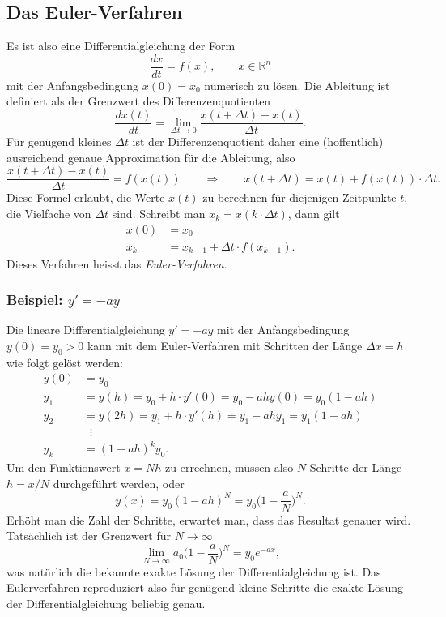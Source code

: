 %
%
%
\subsection{Das Euler-Verfahren\label{subsection:euler}}
Es ist also eine Differentialgleichung der Form
\[
\frac{dx}{dt} = f(x),\qquad x\in\mathbb R^n
\]
mit der Anfangsbedingung $x(0)=x_0$ numerisch zu lösen.
Die Ableitung ist definiert als der Grenzwert des Differenzenquotienten
\[
\frac{dx(t)}{dt}
=
\lim_{\Delta t\to 0}
\frac{x(t+\Delta t)-x(t)}{\Delta t}.
\]
Für genügend kleines $\Delta t$ ist der Differenzenquotient daher eine
(hoffentlich) ausreichend genaue Approximation für die Ableitung,
also
\begin{equation}
\frac{x(t+\Delta t)-x(t)}{\Delta t} = f(x(t))
\qquad\Rightarrow\qquad
x(t+\Delta t) = x(t) + f(x(t))\cdot \Delta t.
\label{skript:euler:differenzenquotient}
\end{equation}
Diese Formel erlaubt, die Werte $x(t)$ zu berechnen für diejenigen
Zeitpunkte $t$, die Vielfache von $\Delta t$ sind.
Schreibt man $x_k = x(k\cdot \Delta t)$, dann gilt
\begin{align*}
x(0) &= x_0\\
x_k &= x_{k-1} + \Delta t \cdot f(x_{k-1}).
\end{align*}
Dieses Verfahren heisst das {\em Euler-Verfahren}.
%

\subsubsection{Beispiel: $y'=-ay$}
Die lineare Differentialgleichung $y'=-ay$ mit der Anfangsbedingung 
$y(0)=y_0 > 0$ kann mit dem Euler-Verfahren mit Schritten der Länge $\Delta x=h$
wie folgt gelöst werden:
\begin{align*}
y(0)&=y_0\\
y_1&=y(h) = y_0 + h\cdot y'(0) = y_0  -ah y(0) = y_0(1 - ah)
\\
y_2&=y(2h) = y_1 + h\cdot y'(h) = y_1  -ah y_1 = y_1(1-ah)
\\
&\;\;\vdots
\\
y_k&= (1-ah)^k y_0.
\end{align*}
Um den Funktionswert $x=Nh$ zu errechnen, müssen also $N$ Schritte der
Länge $h=x/N$ durchgeführt werden, oder
\[
y(x) = y_0(1-ah)^N =
y_0
\biggl(
1-\frac{a}{N}
\biggr)^N.
\]
Erhöht man die Zahl der Schritte, erwartet man, dass das Resultat genauer
wird.
Tatsächlich ist der Grenzwert für $N\to\infty$
\[
\lim_{N\to\infty} a_0\biggl(1-\frac{a}{N}\biggr)^N
=
y_0
e^{-ax},
\]
was natürlich die bekannte exakte Lösung der Differentialgleichung ist.
Das Eulerverfahren reproduziert also für genügend kleine Schritte 
die exakte Lösung der Differentialgleichung beliebig genau.

